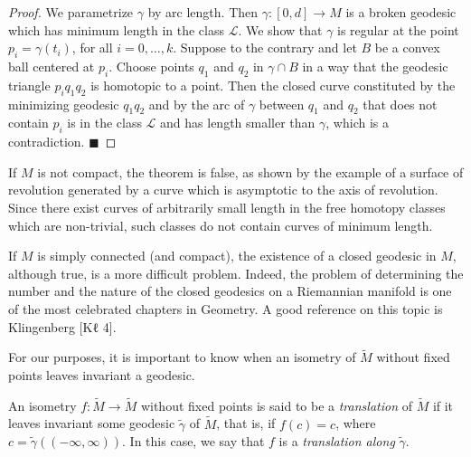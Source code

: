 \begin{proof}
  We parametrize $\gamma$ by arc length. Then $\gamma:[0,d]\to M$ is a broken
  geodesic which has minimum length in the class $\mathcal{L}$. We show that
  $\gamma$ is regular at the point $p_i=\gamma(t_i)$, for all $i=0,\dots,k$. Suppose
  to the contrary and let $B$ be a convex ball centered at $p_i$. Choose points
  $q_1$ and $q_2$ in $\gamma\cap B$ in a way that the geodesic triangle
  $p_iq_1q_2$ is homotopic to a point. Then the closed curve constituted by the
  minimizing geodesic $q_1q_2$ and by the arc of $\gamma$ between $q_1$ and $q_2$
  that does not contain $p_i$ is in the class $\mathcal{L}$ and has length smaller
  than $\gamma$, which is a contradiction. $\blacksquare$
\end{proof}

\begin{remark}[Remark 2.3]
  \label{rem:dc-ch12-2-3}
  If $M$ is not compact, the theorem is false, as shown by the example of a surface
  of revolution generated by a curve which is asymptotic to the axis of revolution.
  Since there exist curves of arbitrarily small length in the free homotopy classes
  which are non-trivial, such classes do not contain curves of minimum length.
\end{remark}

\begin{remark}[Remark 2.4]
  \label{rem:dc-ch12-2-4}
  If $M$ is simply connected (and compact), the existence of a closed geodesic in
  $M$, although true, is a more difficult problem. Indeed, the problem of
  determining the number and the nature of the closed geodesics on a Riemannian
  manifold is one of the most celebrated chapters in Geometry. A good reference on
  this topic is Klingenberg [Kℓ 4].
  
  For our purposes, it is important to know when an isometry of $\tilde{M}$ without
  fixed points leaves invariant a geodesic.
\end{remark}

\begin{definition}[translation]
  \label{def:dc-ch12-2-5}
  An isometry $f:\tilde{M}\to\tilde{M}$ without fixed points is said to be a
  \emph{translation} of $\tilde{M}$ if it leaves invariant some geodesic $\tilde{\gamma}$
  of $\tilde{M}$, that is, if $f(c)=c$, where $c=\tilde{\gamma}((-\infty,\infty))$.
  In this case, we say that $f$ is a \emph{translation along} $\tilde{\gamma}$.
\end{definition}

